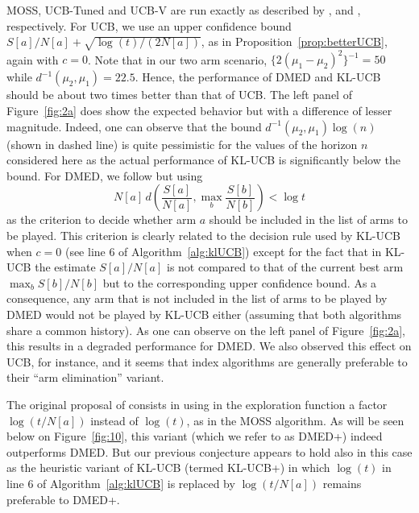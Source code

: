 \documentclass[wcp]{jmlr}
\newcommand{\1}{\mathbbm{1}}
\begin{document}
{MOSS, UCB-Tuned and UCB-V are run exactly as described by \cite{audibert:bubeck:2010:minimax}, \cite{AuerEtAl02FiniteTime}
and \cite{AudibertEtAlUCBV}, respectively. For UCB, we use an upper confidence bound 
$S[a]/N[a] + \sqrt{\log(t)/(2 N[a])}$, as in Proposition~\ref{prop:betterUCB}, again with $c=0$.
Note that in our two arm scenario, $\{2(\mu_1-\mu_2)^2\}^{-1} = 50$ while
$d^{-1}(\mu_2,\mu_1) = 22.5$. Hence, the performance of DMED and KL-UCB should be
about two times better than that of UCB. The left panel of
Figure~\ref{fig:2a} does show the expected behavior but with a difference
of lesser magnitude. Indeed, one can observe that the bound
$d^{-1}(\mu_2,\mu_1)\log(n)$ (shown in dashed line) is quite pessimistic for
the values of the horizon $n$ considered here as the actual performance of
KL-UCB is significantly below the bound. 
For DMED, we follow \cite{HondaTakemura10DMED} but using
\begin{equation}
  \label{eq:dmed}
  N[a] \, d\left(\frac{S[a]}{N[a]}, \max_b\frac{S[b]}{N[b]}\right) < \log t   
\end{equation}
as the criterion to decide whether arm $a$ should be included in the list of
arms to be played. This criterion is clearly related to the decision rule used
by KL-UCB when $c=0$ (see line 6 of Algorithm~\ref{alg:klUCB}) except for the
fact that in KL-UCB the estimate $S[a]/N[a]$ is not compared to that of the
current best arm $\max_b S[b]/N[b]$ but to the corresponding upper confidence
bound. As a consequence, any arm that is not included in the list of arms to be
played by DMED would not be played by KL-UCB either (assuming that both
algorithms share a common history). As one can observe on the left panel of
Figure~\ref{fig:2a}, this results in a degraded performance for DMED. We also
observed this effect on UCB, for instance, and it seems that index algorithms
are generally preferable to their ``arm elimination'' variant.

The original proposal of \cite{HondaTakemura10DMED} consists in using in the
exploration function a factor $\log(t/N[a])$ instead of $\log(t)$, as in the MOSS algorithm.
As will be seen below on Figure~\ref{fig:10}, this variant (which we refer to as
DMED+) indeed outperforms DMED. But our previous conjecture appears to hold also
in this case as the heuristic variant of KL-UCB (termed KL-UCB+) in which
$\log(t)$ in line 6 of Algorithm~\ref{alg:klUCB} is replaced by $\log(t/N[a])$
remains preferable to DMED+. 

}
\end{document}
